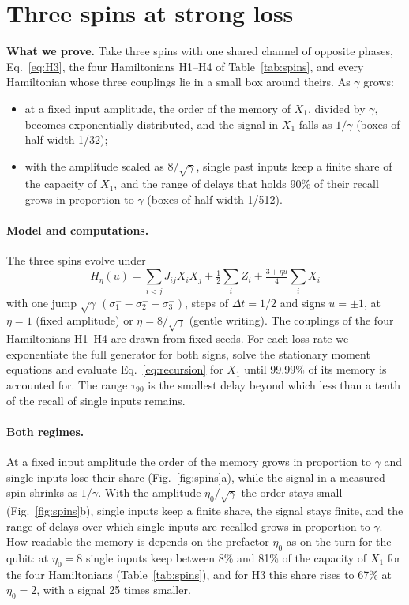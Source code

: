 \section{Three spins at strong loss}
\label{app:spins}
\begin{keybox}
\textbf{What we prove.} Take three spins with one shared channel of opposite phases, Eq.~\eqref{eq:H3}, the four
Hamiltonians H1--H4 of Table~\ref{tab:spins}, and every Hamiltonian whose three couplings lie in a small box around
theirs. As $\gamma$ grows:
\begin{itemize}[leftmargin=*,itemsep=2pt,topsep=4pt]
\item at a fixed input amplitude, the order of the memory of $X_1$, divided by $\gamma$, becomes exponentially
  distributed, and the signal in $X_1$ falls as $1/\gamma$ (boxes of half-width 1/32);
\item with the amplitude scaled as $8/\sqrt\gamma$, single past inputs keep a finite share of the capacity of $X_1$,
  and the range of delays that holds 90\% of their recall grows in proportion to $\gamma$ (boxes of half-width
  1/512).
\end{itemize}
\end{keybox}

\paragraph{Model and computations.}
The three spins evolve under
\begin{equation}
  H_\eta(u)=\sum_{i<j}J_{ij}X_iX_j+\tfrac12\sum_iZ_i+\tfrac{3+\eta u}{4}\sum_iX_i
  \label{eq:H3}
\end{equation}
with one jump $\sqrt\gamma\,(\sigma_1^--\sigma_2^--\sigma_3^-)$, steps of $\Delta t=1/2$ and signs $u=\pm1$, at
$\eta=1$ (fixed amplitude) or $\eta=8/\sqrt\gamma$ (gentle writing). The couplings of the four Hamiltonians H1--H4
are drawn from fixed seeds. For each loss rate we exponentiate the full generator for both signs, solve the
stationary moment equations and evaluate Eq.~\eqref{eq:recursion} for $X_1$ until 99.99\% of its memory is accounted
for. The range $\tau_{90}$ is the smallest delay beyond which less than a tenth of the recall of single inputs
remains.

\paragraph{Both regimes.}
At a fixed input amplitude the order of the memory grows in proportion to $\gamma$ and single inputs lose their share
(Fig.~\ref{fig:spins}a), while the signal in a measured spin shrinks as $1/\gamma$. With the amplitude
$\eta_0/\sqrt\gamma$ the order stays small (Fig.~\ref{fig:spins}b), single inputs keep a finite share, the signal stays
finite, and the range of delays over which single inputs are recalled grows in proportion to $\gamma$. How readable
the memory is depends on the prefactor $\eta_0$ as on the turn for the qubit: at $\eta_0=8$ single inputs keep between
8\% and 81\% of the capacity of $X_1$ for the four Hamiltonians (Table~\ref{tab:spins}), and for H3 this share rises to
67\% at $\eta_0=2$, with a signal 25 times smaller.

